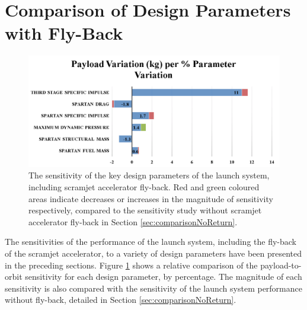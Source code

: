 \section{Comparison of Design Parameters with Fly-Back}


\begin{figure}[th]
	\centering
	\includegraphics[width=0.99\linewidth]{figures/6_FlyBack/BarChart}
	\caption{The sensitivity of the key design parameters of the launch system, including scramjet accelerator fly-back. Red and green coloured areas indicate decreases or increases in the magnitude of sensitivity respectively, compared to the sensitivity study without scramjet accelerator fly-back in Section \ref{sec:comparisonNoReturn}.}
	\label{fig:BarChartreturn}
\end{figure}

The sensitivities of the performance of the launch system, including the fly-back of the scramjet accelerator, to a variety of design parameters have been presented in the preceding sections. Figure \ref{fig:BarChartreturn} shows a relative comparison of the payload-to-orbit sensitivity for each design parameter, by percentage. The magnitude of each sensitivity is also compared with the sensitivity of the launch system performance without fly-back, detailed in Section \ref{sec:comparisonNoReturn}.

